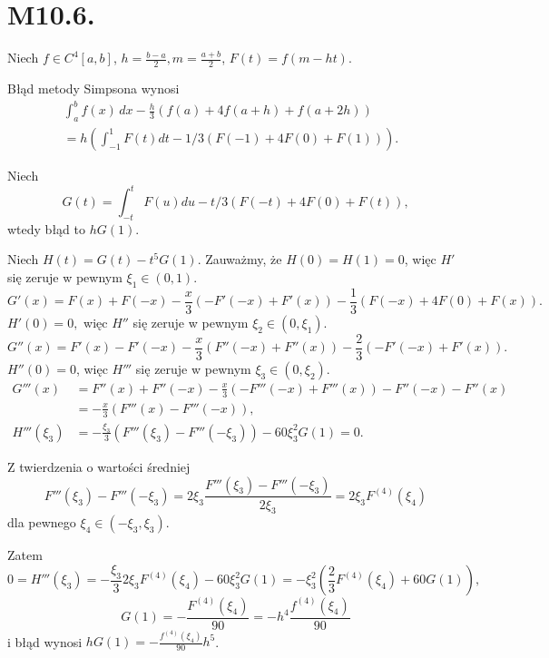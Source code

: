 \documentclass[a4paper, 12pt]{article}
\begin{document}
\section*{M10.6.}
Niech $f ∈ C^4[a,b]$,
$h = \frac{b-a}{2}, m = \frac{a+b}{2}$,
$F(t) = f(m-ht)$.

Błąd metody Simpsona wynosi
\begin{align*}
∫_a^b f(x) \,dx - \frac{h}{3}\left(f(a) + 4f(a+h) + f(a+2h)\right) & \\
= h \left(∫_{-1}^1 F(t) dt - 1/3(F(-1) + 4F(0) + F(1))\right).
\end{align*}

Niech
$$G(t) = ∫_{-t}^t F(u) du - t/3(F(-t) + 4F(0) + F(t)),$$
wtedy błąd to $hG(1)$.

Niech $H(t) = G(t) - t^5G(1)$.
Zauważmy, że
$H(0) = H(1) = 0$, więc $H′$ się zeruje w pewnym $ξ_1 ∈ (0,1)$.
$$G′(x) = F(x) + F(-x) - \frac{x}{3}(-F′(-x) + F′(x)) - \frac{1}{3}(F(-x) + 4F(0) + F(x)).$$
$H′(0) = 0,$ więc $H″$ się zeruje w pewnym $ξ_2 ∈ (0, ξ_1).$
$$G″(x) = F′(x) - F′(-x) - \frac{x}{3}(F″(-x) + F″(x)) - \frac{2}{3}(-F′(-x) + F′(x)).$$
$H″(0) = 0$, więc $H‴$ się zeruje w pewnym $ξ_3 ∈ (0, ξ_2)$.
\begin{align*}
G‴(x)
&= F″(x) + F″(-x) - \frac{x}{3}(-F‴(-x) + F‴(x)) - F″(-x) - F″(x) \\
&= -\frac{x}{3}(F‴(x) - F‴(-x)), \\
H‴(ξ_3) &= -\frac{ξ_3}{3}(F‴(ξ_3) - F‴(-ξ_3)) - 60 ξ_3^2 G(1) = 0.
\end{align*}

Z twierdzenia o wartości średniej
$$F‴(ξ_3) - F‴(-ξ_3) = 2ξ_3 \frac{F‴(ξ_3) - F‴(-ξ_3)}{2ξ_3} = 2ξ_3 F^{(4)}(ξ_4)$$
dla pewnego $ξ_4 ∈ (-ξ_3, ξ_3).$

Zatem
$$0 = H‴(ξ_3) = -\frac{ξ_3}{3} 2ξ_3 F^{(4)}(ξ_4) - 60ξ_3^2 G(1)
            = -ξ_3^2 \left(\frac{2}{3}F^{(4)}(ξ_4) + 60 G(1)\right),$$
$$G(1) = -\frac{F^{(4)}(ξ_4)}{90} = -h^4 \frac{f^{(4)}(ξ_4)}{90}$$
i błąd wynosi $h G(1) = -\frac{f^{(4)} (ξ_4)}{90} h^5$.
\end{document}

